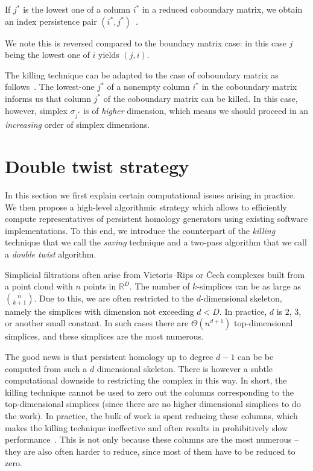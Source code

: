 \begin{property}[Pairing]
\label{prop:copairing}
If $j^*$ is the lowest one of a column $i^*$ in a reduced coboundary matrix, we obtain an index persistence pair $(i^*, j^*)$~\cite{phat, deSilva_2011}. 
\end{property}
We note this is reversed compared to the boundary matrix case: in this case $j$ being the lowest one of $i$ yields $(j, i)$.

The killing technique can be adapted to the case of coboundary matrix as follows~\cite{phat}. The lowest-one $j^*$ of a nonempty column $i^*$ in the coboundary matrix informs us that column $j^*$ of the coboundary matrix can be killed. In this case, however, simplex $\sigma_{j^*}$ is of \emph{higher} dimension, which means we should proceed in an \emph{increasing} order of simplex dimensions. 

\section{Double twist strategy}
\label{sec:doubletwist}
In this section we first explain certain computational issues arising in practice. We then propose a high-level algorithmic strategy which allows to efficiently compute representatives of persistent homology generators using existing software implementations. To this end, we introduce the counterpart of the \emph{killing} technique that we call the \emph{saving} technique and a two-pass algorithm that we call a \emph{double twist} algorithm.


Simplicial filtrations often arise from Vietoris--Rips or {\v C}ech complexes built from a point cloud with $n$ points in $\mathbb{R}^D$. The number of $k$-simplices can be as large as ${n \choose {k+1}}$. Due to this, we are often restricted to the $d$-dimensional skeleton, namely the simplices with dimension not exceeding $d < D$. In practice, $d$ is $2$, $3$, or another small constant. In such cases there are $\Theta(n^{d+1})$ top-dimensional simplices,  and these simplices are the most numerous.

The good news is that persistent homology up to degree $d-1$ can be be computed from such a $d$ dimensional skeleton. There is however a subtle computational downside to restricting the complex in this way. In short, the killing technique cannot be used to zero out the columns corresponding to the top-dimensional simplices (since there are no higher dimensional simplices to do the work). In practice, the bulk of work is spent reducing these columns, which makes the killing technique ineffective and often results in prohibitively slow performance~\cite{phat}. This is not only because these columns are the most numerous -- they are also often harder to reduce, since most of them have to be reduced to zero.

